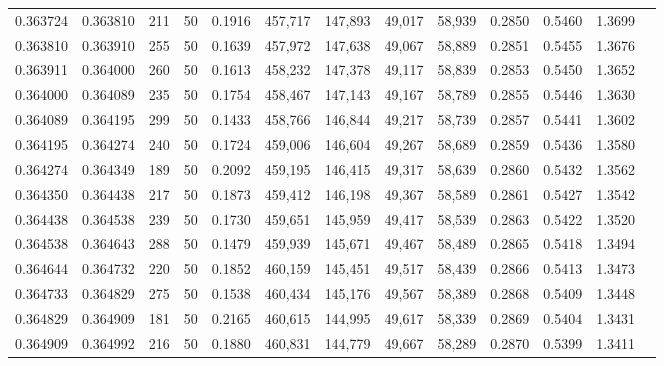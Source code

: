 \begin{tabular}{rrrrrrrrrrrrr}
0.363724 & 0.363810 &   211 &  50 &                                     0.1916 & 457,717 & 147,893 &  49,017 &  58,939 & 0.2850 & 0.5460 & 1.3699 \\
0.363810 & 0.363910 &   255 &  50 &                                     0.1639 & 457,972 & 147,638 &  49,067 &  58,889 & 0.2851 & 0.5455 & 1.3676 \\
0.363911 & 0.364000 &   260 &  50 &                                     0.1613 & 458,232 & 147,378 &  49,117 &  58,839 & 0.2853 & 0.5450 & 1.3652 \\
0.364000 & 0.364089 &   235 &  50 &                                     0.1754 & 458,467 & 147,143 &  49,167 &  58,789 & 0.2855 & 0.5446 & 1.3630 \\
0.364089 & 0.364195 &   299 &  50 &                                     0.1433 & 458,766 & 146,844 &  49,217 &  58,739 & 0.2857 & 0.5441 & 1.3602 \\
0.364195 & 0.364274 &   240 &  50 &                                     0.1724 & 459,006 & 146,604 &  49,267 &  58,689 & 0.2859 & 0.5436 & 1.3580 \\
0.364274 & 0.364349 &   189 &  50 &                                     0.2092 & 459,195 & 146,415 &  49,317 &  58,639 & 0.2860 & 0.5432 & 1.3562 \\
0.364350 & 0.364438 &   217 &  50 &                                     0.1873 & 459,412 & 146,198 &  49,367 &  58,589 & 0.2861 & 0.5427 & 1.3542 \\
0.364438 & 0.364538 &   239 &  50 &                                     0.1730 & 459,651 & 145,959 &  49,417 &  58,539 & 0.2863 & 0.5422 & 1.3520 \\
0.364538 & 0.364643 &   288 &  50 &                                     0.1479 & 459,939 & 145,671 &  49,467 &  58,489 & 0.2865 & 0.5418 & 1.3494 \\
0.364644 & 0.364732 &   220 &  50 &                                     0.1852 & 460,159 & 145,451 &  49,517 &  58,439 & 0.2866 & 0.5413 & 1.3473 \\
0.364733 & 0.364829 &   275 &  50 &                                     0.1538 & 460,434 & 145,176 &  49,567 &  58,389 & 0.2868 & 0.5409 & 1.3448 \\
0.364829 & 0.364909 &   181 &  50 &                                     0.2165 & 460,615 & 144,995 &  49,617 &  58,339 & 0.2869 & 0.5404 & 1.3431 \\
0.364909 & 0.364992 &   216 &  50 &                                     0.1880 & 460,831 & 144,779 &  49,667 &  58,289 & 0.2870 & 0.5399 & 1.3411 \\

\end{tabular}
